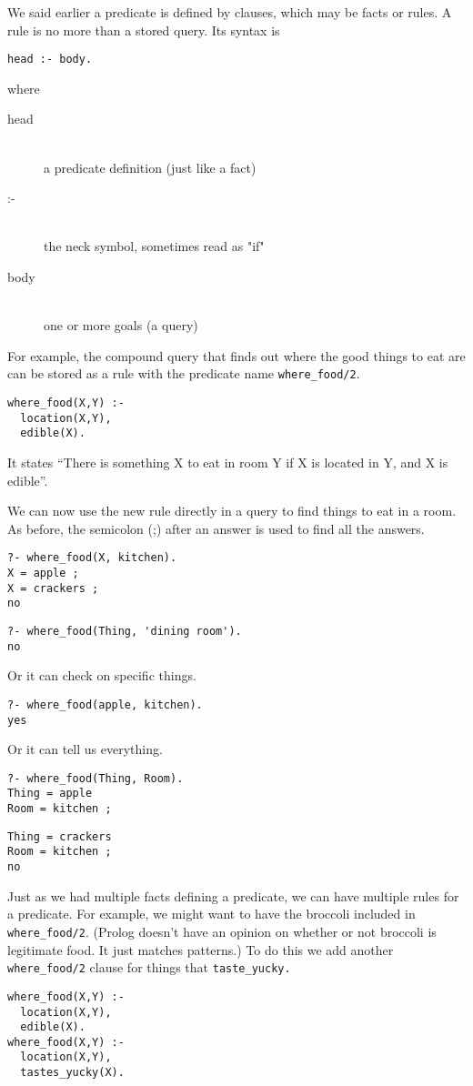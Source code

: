 \label{adv5}\secdown

We said earlier a predicate is defined by clauses, which may be facts or rules. A rule is no more than a stored query. Its syntax is
\begin{verbatim}
head :- body.
\end{verbatim}
where
\begin{description}
\item[head]\ \\
a predicate definition (just like a fact)
\item[:-]\ \\
the neck symbol, sometimes read as "if"
\item[body]\ \\
one or more goals (a query)
\end{description}

For example, the compound query that finds out where the good things to eat are
can be stored as a rule with the predicate name \verb'where_food/2'.
\begin{verbatim}
where_food(X,Y) :-  
  location(X,Y),
  edible(X).
\end{verbatim}
It states ``There is something X to eat in room Y if X is located in Y, and X
is edible''.

We can now use the new rule directly in a query to find things to eat in a room.
As before, the semicolon (;) after an answer is used to find all the answers.
\begin{verbatim}
?- where_food(X, kitchen).
X = apple ;
X = crackers ;
no
\end{verbatim}
\begin{verbatim}
?- where_food(Thing, 'dining room').
no
\end{verbatim}
Or it can check on specific things.
\begin{verbatim}
?- where_food(apple, kitchen).
yes
\end{verbatim}
Or it can tell us everything.
\begin{verbatim}
?- where_food(Thing, Room).
Thing = apple
Room = kitchen ;
\end{verbatim}
\begin{verbatim}
Thing = crackers
Room = kitchen ;
no
\end{verbatim}

Just as we had multiple facts defining a predicate, we can have multiple rules
for a predicate. For example, we might want to have the broccoli included in
\verb'where_food/2'. (Prolog doesn't have an opinion on whether or not broccoli
is legitimate food. It just matches patterns.) To do this we add another
\verb'where_food/2' clause for things that \verb'taste_yucky.'
\begin{verbatim}
where_food(X,Y) :-
  location(X,Y),
  edible(X).
where_food(X,Y) :-
  location(X,Y),
  tastes_yucky(X).
\end{verbatim}

